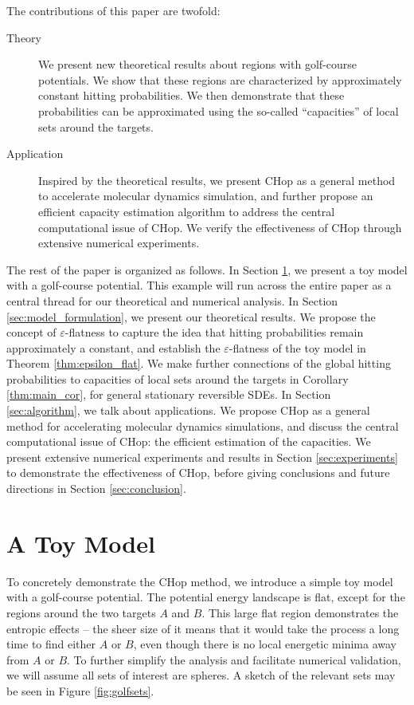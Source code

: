 \documentclass[english, aip, jcp, priprint, graphicx]{revtex4-1}
\theoremstyle{plain}
\theoremstyle{definition}
\theoremstyle{plain}
\begin{document}
The contributions of this paper are twofold:

\begin{description}
	\item[Theory] We present new theoretical results about regions with golf-course potentials.  We show that these regions are characterized by approximately constant hitting probabilities.  We then demonstrate that these probabilities can be approximated using the so-called “capacities” of local sets around the targets.
	\item[Application] Inspired by the theoretical results, we present CHop as a general method to accelerate molecular dynamics simulation, and further propose an efficient capacity estimation algorithm to address the central computational issue of CHop.  We verify the effectiveness of CHop through extensive numerical experiments.
\end{description}

The rest of the paper is organized as follows. In Section \ref{sec:toy_model}, we present a toy model with a golf-course potential.  This example will run across the entire paper as a central thread for our theoretical and numerical analysis. In Section \ref{sec:model_formulation}, we present our theoretical results. We propose the concept of $\varepsilon$-flatness to capture the idea that hitting probabilities remain approximately a constant, and establish the $\varepsilon$-flatness of the toy model in Theorem \ref{thm:epsilon_flat}. We make further connections of the global hitting probabilities to capacities of local sets around the targets in Corollary \ref{thm:main_cor}, for general stationary reversible SDEs. In Section \ref{sec:algorithm}, we talk about applications. We propose CHop as a general method for accelerating molecular dynamics simulations, and discuss the central computational issue of CHop: the efficient estimation of the capacities. We present extensive numerical experiments and results in Section \ref{sec:experiments} to demonstrate the effectiveness of CHop, before giving conclusions and future directions in Section \ref{sec:conclusion}.

\section{A Toy Model}\label{sec:toy_model}

To concretely demonstrate the CHop method, we introduce a simple toy model with a golf-course potential. The potential energy landscape is flat, except for the regions around the two targets $A$ and $B$. This large flat region demonstrates the entropic effects -- the sheer size of it means that it would take the process a long time to find either $A$ or $B$, even though there is no local energetic minima away from $A$ or $B$. To further simplify the analysis and facilitate numerical validation, we will assume all sets of interest are spheres.  A sketch of the relevant sets may be seen in Figure \ref{fig:golfsets}.
\end{document}
